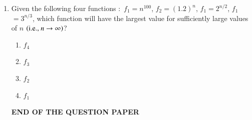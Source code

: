 \documentclass[journal,12pt,onecolumn]{IEEEtran}
\theoremstyle{remark}
\begin{document}
\begin{enumerate}
\item Given the following four functions $\colon$ 
$f_1 $$= n^{100}$, 
$f_2 $$ = (1.2)^n$, 
$f_1 $$ = 2^{n/2}$, 
$f_1 $$ = 3^{n/3}$, 
which function will have the largest value for sufficiently large values of $n$ $\left(\text{i.e., } n \to \infty\right)$?

\hfill{}

\begin{multicols}{4}
\begin{enumerate}
\item $f_4$
\item $f_3$
\item $f_2$
\item $f_1$
\end{enumerate}
\end{multicols}

\begin{center}
\Large\textbf{{END OF THE QUESTION PAPER}}
\end{center}
\end{enumerate}
\end{document}
